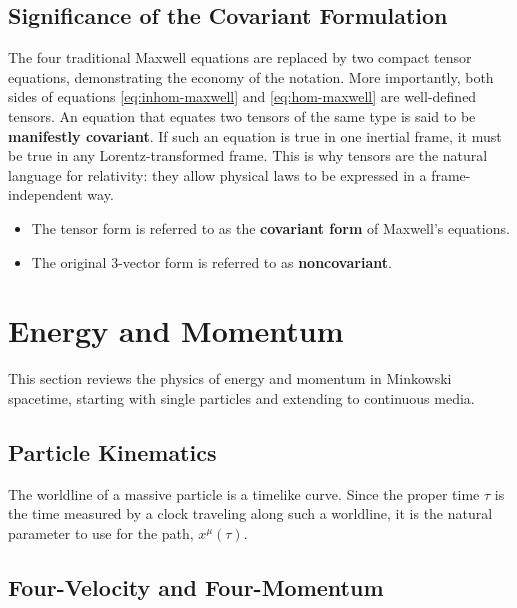 \documentclass[11pt, a4paper]{report}
\begin{document}
\subsection*{Significance of the Covariant Formulation}

The four traditional Maxwell equations are replaced by two compact tensor equations, demonstrating the economy of the notation. More importantly, both sides of equations  \eqref{eq:inhom-maxwell} and \eqref{eq:hom-maxwell}  are well-defined tensors. An equation that equates two tensors of the same type is said to be \textbf{manifestly covariant}. If such an equation is true in one inertial frame, it must be true in any Lorentz-transformed frame. This is why tensors are the natural language for relativity: they allow physical laws to be expressed in a frame-independent way.

\begin{itemize}
    \item The tensor form is referred to as the \textbf{covariant form} of Maxwell's equations.
    \item The original 3-vector form is referred to as \textbf{noncovariant}.
\end{itemize}
\section{Energy and Momentum}

This section reviews the physics of energy and momentum in Minkowski spacetime, starting with single particles and extending to continuous media.

\subsection*{Particle Kinematics}

The worldline of a massive particle is a timelike curve. Since the proper time $\tau$ is the time measured by a clock traveling along such a worldline, it is the natural parameter to use for the path, $x^\mu(\tau)$.

\subsection*{Four-Velocity and Four-Momentum}
\end{document}
